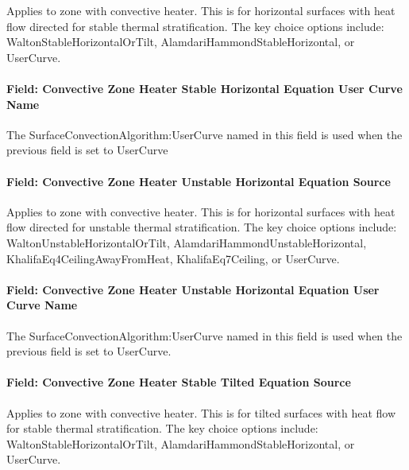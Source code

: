 Applies to zone with convective heater. This is for horizontal surfaces with heat flow directed for stable thermal stratification. The key choice options include: WaltonStableHorizontalOrTilt, AlamdariHammondStableHorizontal, or UserCurve.

\paragraph{Field: Convective Zone Heater Stable Horizontal Equation User Curve Name}\label{field-convective-zone-heater-stable-horizontal-equation-user-curve-name}

The SurfaceConvectionAlgorithm:UserCurve named in this field is used when the previous field is set to UserCurve

\paragraph{Field: Convective Zone Heater Unstable Horizontal Equation Source}\label{field-convective-zone-heater-unstable-horizontal-equation-source}

Applies to zone with convective heater. This is for horizontal surfaces with heat flow directed for unstable thermal stratification. The key choice options include: WaltonUnstableHorizontalOrTilt, AlamdariHammondUnstableHorizontal, KhalifaEq4CeilingAwayFromHeat, KhalifaEq7Ceiling, or UserCurve.

\paragraph{Field: Convective Zone Heater Unstable Horizontal Equation User Curve Name}\label{field-convective-zone-heater-unstable-horizontal-equation-user-curve-name}

The SurfaceConvectionAlgorithm:UserCurve named in this field is used when the previous field is set to UserCurve.

\paragraph{Field: Convective Zone Heater Stable Tilted Equation Source}\label{field-convective-zone-heater-stable-tilted-equation-source}

Applies to zone with convective heater. This is for tilted surfaces with heat flow for stable thermal stratification. The key choice options include: WaltonStableHorizontalOrTilt, AlamdariHammondStableHorizontal, or UserCurve.


